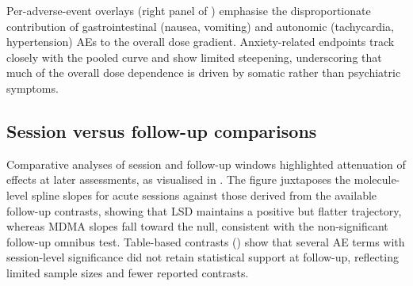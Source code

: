 Per-adverse-event overlays (right panel of ) emphasise the disproportionate contribution of gastrointestinal (nausea, vomiting) and autonomic (tachycardia, hypertension) AEs to the overall dose gradient. Anxiety-related endpoints track closely with the pooled curve and show limited steepening, underscoring that much of the overall dose dependence is driven by somatic rather than psychiatric symptoms.

\subsection{Session versus follow-up comparisons}
Comparative analyses of session and follow-up windows highlighted attenuation of effects at later assessments, as visualised in . The figure juxtaposes the molecule-level spline slopes for acute sessions against those derived from the available follow-up contrasts, showing that LSD maintains a positive but flatter trajectory, whereas MDMA slopes fall toward the null, consistent with the non-significant follow-up omnibus test. Table-based contrasts () show that several AE terms with session-level significance did not retain statistical support at follow-up, reflecting limited sample sizes and fewer reported contrasts.


